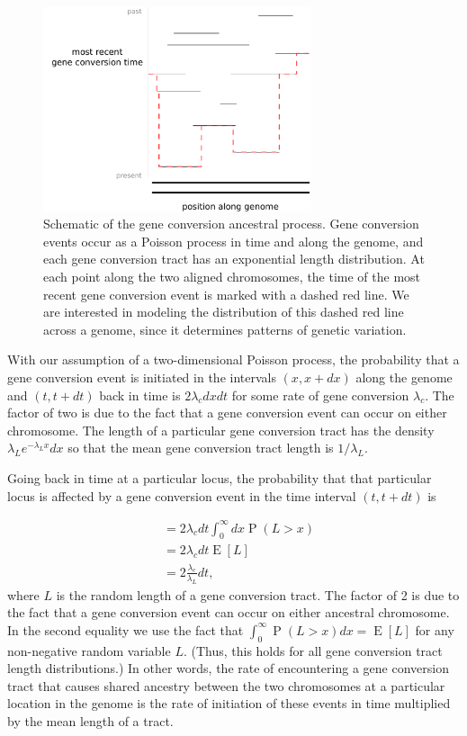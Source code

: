 \documentclass{article}
\DeclareMathOperator{\Prob}{P}
\DeclareMathOperator{\E}{E}
\begin{document}
\begin{figure}
    \centering
    \includegraphics[width=0.7\textwidth]{figs/geneconversion.pdf}
    \caption{
        Schematic of the gene conversion ancestral process. Gene conversion
        events occur as a Poisson process in time and along the genome, and
        each gene conversion tract has an exponential length distribution. At
        each point along the two aligned chromosomes, the time of the most
        recent gene conversion event is marked with a dashed red line. We are
        interested in modeling the distribution of this dashed red line across a
        genome, since it determines patterns of genetic variation.}
    \label{fig:geneconversiondiagram}
\end{figure}

With our assumption of a two-dimensional Poisson process, the probability that
a gene conversion event is initiated in the intervals $(x, x+dx)$ along the
genome and $(t,t+dt)$ back in time is $2\lambda_c dxdt$ for some rate of gene
conversion $\lambda_c$. The factor of two is due to the fact that a gene
conversion event can occur on either chromosome. The length of a particular
gene conversion tract has the density $\lambda_Le^{-\lambda_Lx}dx$ so that
the mean gene conversion tract length is $1/\lambda_L$.

Going back in time at a particular locus, the probability that that particular
locus is affected by a gene conversion event in the time interval $(t, t+dt)$
is 

\begin{align*}
    &= 2\lambda_c dt \int_0^{\infty} dx \Prob(L>x)\\
    &= 2\lambda_c dt \E[L]\\
    &= 2\frac{\lambda_c}{\lambda_L}dt,
\end{align*}
where $L$ is the random length of a gene conversion tract. The factor of 2 is
due to the fact that a gene conversion event can occur on either ancestral
chromosome. In the second equality we use the fact that $\int_0^\infty
\Prob(L>x)dx = \E[L]$ for any non-negative random variable $L$. (Thus, this
holds for all gene conversion tract length distributions.) In other words, the
rate of encountering a gene conversion tract that causes shared ancestry
between the two chromosomes at a particular location in the genome is the rate
of initiation of these events in time multiplied by the mean length of a tract.
\end{document}
